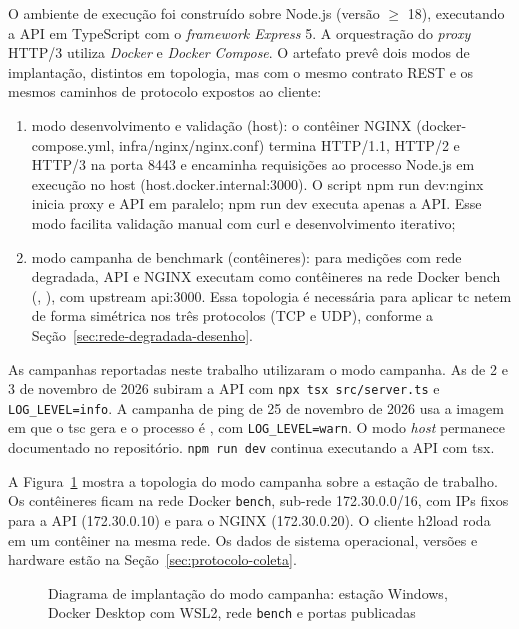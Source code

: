 O ambiente de execução foi construído sobre Node.js (versão $\geq$ 18), executando a API em TypeScript com o \textit{framework Express} 5. A orquestração do \textit{proxy} HTTP/3 utiliza \textit{Docker} e \textit{Docker }\textit{Compose}. O artefato prevê dois modos de implantação, distintos em topologia, mas com o mesmo contrato REST e os mesmos caminhos de protocolo expostos ao cliente:

\begin{enumerate}[label=\alph*)]
\item modo desenvolvimento e validação (host): o contêiner NGINX (docker-compose.yml, infra/nginx/nginx.conf) termina HTTP/1.1, HTTP/2 e HTTP/3 na porta 8443 e encaminha requisições ao processo Node.js em execução no host (host.docker.internal:3000). O script npm run dev:nginx inicia proxy e API em paralelo; npm run dev executa apenas a API. Esse modo facilita validação manual com curl e desenvolvimento iterativo;
\item modo campanha de benchmark (contêineres):  para medições com rede degradada, API e NGINX executam como contêineres na rede Docker bench (, ), com upstream api:3000. Essa topologia é necessária para aplicar tc netem de forma simétrica nos três protocolos (TCP e UDP), conforme a Seção~\ref{sec:rede-degradada-desenho}.
\end{enumerate}

As campanhas reportadas neste trabalho utilizaram o modo campanha. As de 2 e 3 de novembro de 2026 subiram a API com \texttt{npx tsx src/server.ts} e \texttt{LOG\_LEVEL=info}. A campanha de ping de 25 de novembro de 2026 usa a imagem em que o tsc gera  e o processo é , com \texttt{LOG\_LEVEL=warn}. O modo \textit{host} permanece documentado no repositório. \texttt{npm run dev} continua executando a API com tsx.

A Figura~\ref{fig:implantacao} mostra a topologia do modo campanha sobre a estação de trabalho. Os contêineres ficam na rede Docker \texttt{bench}, sub-rede 172.30.0.0/16, com IPs fixos para a API (172.30.0.10) e para o NGINX (172.30.0.20). O cliente h2load roda em um contêiner na mesma rede. Os dados de sistema operacional, versões e hardware estão na Seção~\ref{sec:protocolo-coleta}.

\begin{figure}[htbp]
\centering

\caption{Diagrama de implantação do modo campanha: estação Windows, Docker Desktop com WSL2, rede \texttt{bench} e portas publicadas}\label{fig:implantacao}
\end{figure}

